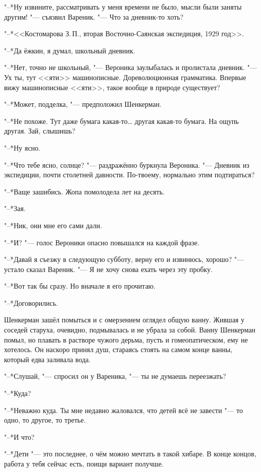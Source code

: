 "--*Ну извините, рассматривать у меня времени не было, мысли были заняты другим! "--- съязвил Вареник.
"--- Что за дневник-то хоть?

"--*<<Костомарова З.\,П., вторая Восточно-Саянская экспедиция, 1929 год>>.

"--*Да ёжкин, я думал, школьный дневник.

"--*Нет, точно не школьный, "--- Вероника заулыбалась и пролистала дневник.
"--- Ух ты, тут <<яти>> машинописные.
Дореволюционная грамматика.
Впервые вижу машинописные <<яти>>, такое вообще в природе существует?

"--*Может, подделка, "--- предположил Шенкерман.

"--*Не похоже.
Тут даже бумага какая-то\ldots{} другая какая-то бумага.
На ощупь другая.
Зай, слышишь?

"--*Ну ясно.

"--*Что тебе ясно, солнце? "--- раздражённо буркнула Вероника.
"--- Дневник из экспедиции, почти столетней давности.
По-твоему, нормально этим подтираться?

"--*Ваще зашибись.
Жопа помолодела лет на десять.

"--*Зая.

"--*Ник, они мне его сами дали.

"--*И? "--- голос Вероники опасно повышался на каждой фразе.

"--*Давай я съезжу в следующую субботу, верну его и извинюсь, хорошо? "--- устало сказал Вареник.
"--- Я не хочу снова ехать через эту пробку.

"--*Вот так бы сразу.
Но вначале я его прочитаю.

"--*Договорились.

\asterism

\textspace

Шенкерман зашёл помыться и с омерзением оглядел общую ванну.
Жившая у соседей старуха, очевидно, подмывалась и не убрала за собой.
Ванну Шенкерман помыл, но плавать в растворе чужого дерьма, пусть и гомеопатическом, ему не хотелось.
Он наскоро принял душ, стараясь стоять на самом конце ванны, который едва заливала вода.

"--*Слушай, "--- спросил он у Вареника, "--- ты не думаешь переезжать?

"--*Куда?

"--*Неважно куда.
Ты мне недавно жаловался, что детей всё не завести "--- то одно, то другое, то третье.

"--*И что?

"--*Дети "--- это последнее, о чём можно мечтать в такой хибаре.
В конце концов, работа у тебя сейчас есть, поищи вариант получше.

